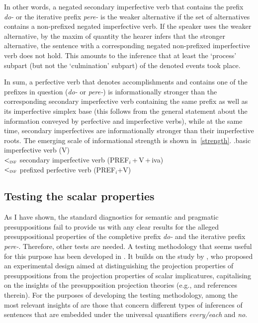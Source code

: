 In other words, a negated secondary imperfective verb that contains the prefix \textit{do-} or the iterative prefix \textit{pere-} is the weaker alternative if the set of alternatives contains a non-prefixed negated imperfective verb. If the speaker uses the weaker alternative, by the maxim of quantity \citep{Grice:75} the hearer infers that the stronger alternative, the sentence with a corresponding negated non-prefixed imperfective verb does not hold. This amounts to the inference that at least the `process' subpart (but not the `culmination' subpart) of the denoted events took place.

In sum, a perfective verb that denotes accomplishments and contains one of the prefixes in question (\textit{do-} or \textit{pere-}) is informationally stronger than the corresponding secondary imperfective verb containing the same prefix as well as its imperfective simplex base (this follows from the general statement about the information conveyed by perfective and imperfective verbs), while at the same time, secondary imperfectives are informationally stronger than their imperfective roots. The emerging scale of informational strength is shown in~\ref{strength}.
\ex.\label{strength}basic imperfective verb (V)\\
$<_{\textsc{inf}}$ secondary imperfective verb (PREF$_i$\,+\,V\,+\,iva)\\ $<_{\textsc{inf}}$ prefixed perfective verb (PREF$_i$+V)

\subsection{Testing the scalar properties}\label{sec:chemla}
As I have shown, the standard diagnostics for semantic and pragmatic presuppositions fail to provide us with any clear results for the alleged presuppositional properties of the completive prefix \textit{do-} and the iterative prefix \textit{pere-}. Therefore, other tests are needed. A testing methodology that seems useful for this purpose has been developed in \citealt{ZinovaFilip:SALT}. It builds on the study by \citet{Chemla:09}, who proposed an experimental design aimed at distinguishing the projection properties of presuppositions from the projection properties of scalar implicatures, capitalising on the insights of the presupposition projection theories (e.g., \citealp{Heim:83, Schlenker:08} and references therein). For the purposes of developing the testing methodology, among the most relevant insights of \citet{Chemla:09} are those that concern different types of inferences of sentences that are embedded under the universal quantifiers \textit{every/each} and \textit{no}.

